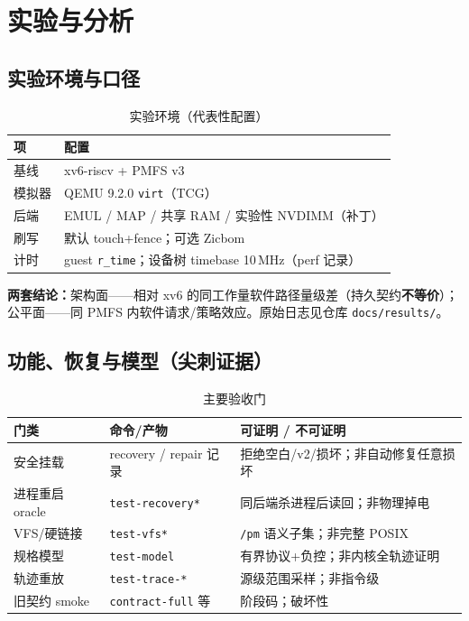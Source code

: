 \chapter{实验与分析}
\label{chap:eval}

\section{实验环境与口径}

\begin{table}[htbp]
  \centering
  \caption{实验环境（代表性配置）}
  \label{tab:env}
  \begin{tabular}{ll}
    \toprule
    项 & 配置 \\
    \midrule
    基线 & xv6-riscv + PMFS v3 \\
    模拟器 & QEMU 9.2.0 \texttt{virt}（TCG） \\
    后端 & EMUL / MAP / 共享 RAM / 实验性 NVDIMM（补丁） \\
    刷写 & 默认 touch+fence；可选 Zicbom \\
    计时 & guest \texttt{r\_time}；设备树 timebase 10\,MHz（perf 记录） \\
    \bottomrule
  \end{tabular}
\end{table}

\textbf{两套结论：}架构面——相对 xv6 的同工作量软件路径量级差（持久契约\textbf{不等价}）；公平面——同 PMFS 内软件请求/策略效应。原始日志见仓库 \texttt{docs/results/}。

\section{功能、恢复与模型（尖刺证据）}

\begin{table}[htbp]
  \centering
  \caption{主要验收门}
  \label{tab:contract}
  \begin{tabular}{p{3.2cm}p{4.2cm}p{5.0cm}}
    \toprule
    门类 & 命令/产物 & 可证明 / 不可证明 \\
    \midrule
    安全挂载 & recovery / repair 记录 & 拒绝空白/v2/损坏；非自动修复任意损坏 \\
    进程重启 oracle & \texttt{test-recovery*} & 同后端杀进程后读回；非物理掉电 \\
    VFS/硬链接 & \texttt{test-vfs*} & \texttt{/pm} 语义子集；非完整 POSIX \\
    规格模型 & \texttt{test-model} & 有界协议+负控；非内核全轨迹证明 \\
    轨迹重放 & \texttt{test-trace-*} & 源级范围采样；非指令级 \\
    旧契约 smoke & \texttt{contract-full} 等 & 阶段码；破坏性 \\
    \bottomrule
  \end{tabular}
\end{table}

